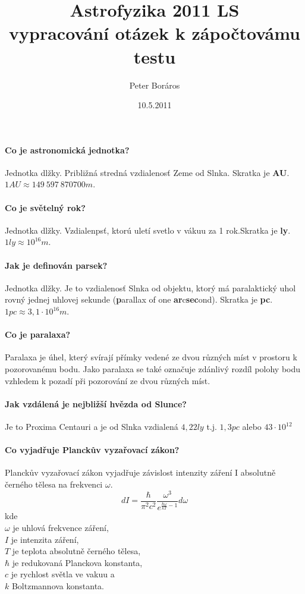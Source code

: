 \documentclass[11pt,a4paper,notitlepage,twocolumn]{article}
\begin{document}
\title{\textbf{Astrofyzika 2011 LS}\\vypracování otázek k zápočtovámu testu}
\author{Peter Boráros}
\date{10.5.2011}

\maketitle

\paragraph{Co je astronomická jednotka?}
Jednotka dlžky. Približná stredná vzdialenosť Zeme od Slnka. Skratka je \textbf{AU}.
 $ 1AU \approx 149~597~870 700 m. $
\paragraph{Co je světelný rok? }
Jednotka dlžky. Vzdialenpsť, ktorú uletí svetlo v vákuu za 1 rok.Skratka je \textbf{ly}.
$ 1ly \approx 10^{16} m $.
\paragraph{Jak je definován parsek?}
Jednotka dlžky. Je to vzdialenosť Slnka od objektu, ktorý má paralaktický uhol rovný
jednej uhlovej sekunde (\textbf{p}arallax of one \textbf{ar}c\textbf{sec}ond). 
Skratka je \textbf{pc}.
$ 1pc \approx 3,1\cdot 10^{16} m $.
\paragraph{Co je paralaxa?}
Paralaxa je úhel, který svírají přímky vedené ze dvou různých míst v prostoru k pozorovanému
bodu. Jako paralaxa se také označuje zdánlivý rozdíl polohy bodu vzhledem k pozadí při
pozorování ze dvou různých míst.
\paragraph{Jak vzdálená je nejbližší hvězda od Slunce?}
Je to Proxima Centauri a je od Slnka vzdialená $ 4,22ly $ t.j. $ 1,3pc $ 
alebo $ 43\cdot10^{12} $
\paragraph{Co vyjadřuje Planckův vyzařovací zákon?}
Planckův vyzařovací zákon vyjadřuje závislost intenzity záření I absolutně černého 
tělesa na frekvenci $ \omega $.
\[  dI = \frac{\hbar}{\pi^2c^2} \frac{\omega^3}{e^{\frac{\hbar \omega}{kT}-1}}d\omega  \]
kde\\
$ \omega $ je uhlová frekvence záření,\\
$ I $ je intenzita záření,\\
$ T $ je teplota absolutně černého tělesa,\\
$ \hbar $ je redukovaná Planckova konstanta,\\
$ c $ je rychlost světla ve vakuu a\\
$ k $ Boltzmannova konstanta.
\end{document}
